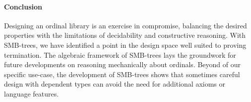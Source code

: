 \paragraph{Conclusion}
Designing an ordinal library is an exercise in compromise, balancing the desired properties
with the limitations of decidability and constructive reasoning.
With SMB-trees, we have identified a point in the design space
well suited to proving termination. The algebraic framework of SMB-trees
lays the groundwork for future developments on reasoning mechanically
about ordinals. Beyond of our specific use-case, the development of
SMB-trees shows that sometimes careful design with dependent types
can avoid the need for additional axioms or language features.
